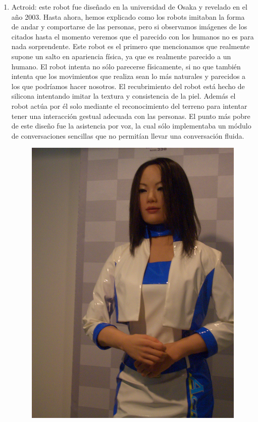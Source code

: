 \begin{enumerate}
  \item Actroid: este robot fue diseñado en la universidad de Osaka y revelado en el año 2003. Hasta ahora, hemos explicado como los robots imitaban la forma de andar y comportarse de las personas, pero si observamos imágenes de los citados hasta el momento veremos que el parecido con los humanos no es para nada sorprendente. Este robot es el primero que mencionamos que realmente supone un salto en apariencia física, ya que es realmente parecido a un humano. El robot intenta no sólo parecerse físicamente, si no que también intenta que los movimientos que realiza sean lo más naturales y parecidos a los que podríamos hacer nosotros. El recubrimiento del robot está hecho de silicona intentando imitar la textura y consistencia de la piel. Además el robot actúa por él solo mediante el reconocimiento del terreno para intentar tener una interacción gestual adecuada con las personas. El punto más pobre de este diseño fue la asistencia por voz, la cual sólo implementaba un módulo de conversaciones sencillas que no permitían llevar una conversación fluida.
  \begin{figure}[!h]
  	\centering
  	\includegraphics[scale=0.1]{./EtapaModerna/Imagenes/actroid.jpg}

\end{figure}
\end{enumerate}
